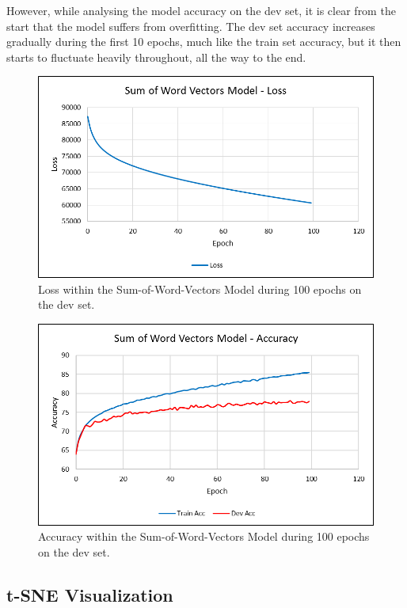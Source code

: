\documentclass{article} %
\begin{document}
However, while analysing the model accuracy on the dev set, it is clear from the start that the model suffers from overfitting. The dev set accuracy increases gradually during the first 10 epochs, much like the train set accuracy, but it then starts to fluctuate heavily throughout, all the way to the end.

\begin{figure}[!htbp]
\centering
\includegraphics{Loss}
\caption{Loss within the Sum-of-Word-Vectors Model during 100 epochs on the dev set.}
\label{fig:LossAnalysisSWVM1}
\end{figure}

\begin{figure}[!htbp]
\centering
\includegraphics{Accuracy}
\caption{Accuracy within the Sum-of-Word-Vectors Model during 100 epochs on the dev set.}
\label{fig:LossAnalysisSWVM2}
\end{figure}

\subsection{t-SNE Visualization}
\end{document}
